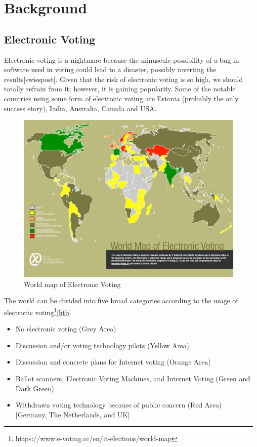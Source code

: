 \chapter{Background}
\label{cha:background}


\section{Electronic Voting}
   Electronic voting is a nightmare because the minuscule possibility of 
   a bug in software used in voting could lead to a disaster, possibly 
   inverting the results[swisspost]. Given that the risk of 
   electronic voting is 
   so high, we should totally refrain from it; however,
   it is gaining popularity. Some of the notable countries using some form
   of electronic voting are Estonia (probably the only success story), India,
   Australia, Canada and USA. 
    \begin{figure}[htb]
	\begin{center}
	\includegraphics[scale=0.5]{e-voting_worldmap_2015.pdf}
	\caption{World map of Electronic Voting}
	\label{fig:world_electronic_voting_map}
	\end{center}
  \end{figure}  
   
  The world can be divided into five broad categories according to 
  the usage of electronic voting\footnote{https://www.e-voting.cc/en/it-elections/world-map}\ref{htb}
  \begin{itemize}
  \item No electronic voting (Grey Area)
  \item Discussion and/or voting technology pilots (Yellow Area)
  \item Discussion and concrete plans for Internet voting (Orange Area)
  \item Ballot scanners, Electronic Voting Machines, and Internet Voting
        (Green and Dark Green)
  \item Withdrawn voting technology because of public concern (Red Area)
        [Germany, The Netherlands, and UK]  
  \end{itemize}    
  
